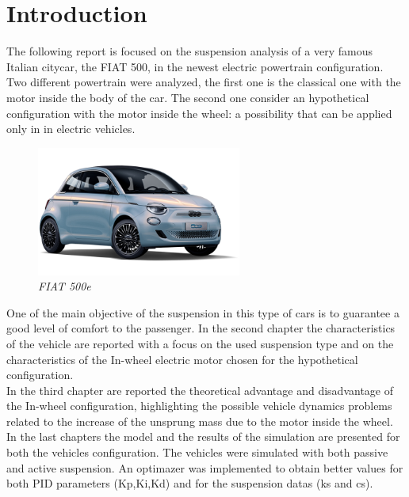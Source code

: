 \documentclass{article}
\numberwithin{equation}{section}
\numberwithin{figure}{section}
\numberwithin{table}{section}
\numberwithin{table}{section}
\begin{document}

\newpage
\tableofcontents
\newpage
\section{Introduction}
The following report is focused on the suspension analysis of a very famous Italian citycar, the FIAT 500, in the newest electric powertrain configuration. Two different powertrain were analyzed, the first one is the classical one with the motor inside the body of the car. The second one consider an hypothetical configuration with the motor inside the wheel: a possibility that can be applied only in in electric vehicles.

\begin{figure}[H]
    \centering
    \includegraphics[width=0.6\textwidth]{Pictures/fiat 500e.png}
    \caption{\emph{FIAT 500e}}
    \label{fig:1}
\end{figure}

One of the main objective of the suspension in this type of cars is to guarantee a good level of comfort to the passenger. %
In the second chapter the characteristics of the vehicle are reported with a focus on the used suspension type and on the characteristics of the In-wheel electric motor chosen for the hypothetical configuration.\\
In the third chapter are reported the theoretical advantage and disadvantage of the In-wheel configuration, highlighting the possible vehicle dynamics problems related to the increase of the unsprung mass due to the motor inside the wheel.\\
In the last chapters the model and the results of the simulation are presented for both the vehicles configuration. The vehicles were simulated with both passive and active suspension. An optimazer was implemented to obtain better values for both PID parameters (Kp,Ki,Kd) and for the suspension datas (ks and cs).
\end{document}
